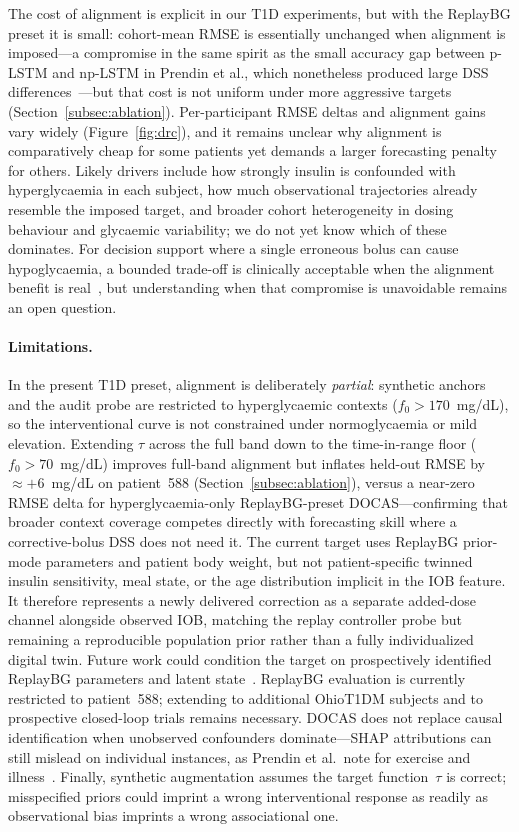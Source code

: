\documentclass[a4paper,fleqn]{cas-sc}
\begin{document}
The cost of alignment is explicit in our T1D experiments, but with the
ReplayBG preset it is small: cohort-mean RMSE is essentially unchanged when
alignment is imposed---a compromise in the same spirit as the small accuracy gap between
p-LSTM and np-LSTM in Prendin et al., which nonetheless produced large DSS
differences~\citep{prendin2023}---but that cost is not uniform under more
aggressive targets (Section~\ref{subsec:ablation}). Per-participant
RMSE deltas and alignment gains vary widely (Figure~\ref{fig:drc}), and it
remains unclear why alignment is comparatively cheap for some patients yet
demands a larger forecasting penalty for others. Likely drivers include how
strongly insulin is confounded with hyperglycaemia in each subject, how much
observational trajectories already resemble the imposed target, and broader
cohort heterogeneity in dosing behaviour and glycaemic variability; we do not yet
know which of these dominates. For decision support where a single erroneous
bolus can cause hypoglycaemia, a bounded trade-off is clinically acceptable when
the alignment benefit is real~\citep{battelino2019,nimri2020}, but understanding
when that compromise is unavoidable remains an open question.

\paragraph{Limitations.}
In the present T1D preset, alignment is deliberately \emph{partial}: synthetic
anchors and the audit probe are restricted to hyperglycaemic contexts
($f_0>170$~mg/dL), so the interventional curve is not constrained under
normoglycaemia or mild elevation. Extending $\tau$ across the full band down to
the time-in-range floor ($f_0>70$~mg/dL) improves full-band alignment but
inflates held-out RMSE by $\approx+6$~mg/dL on patient~588
(Section~\ref{subsec:ablation}), versus a near-zero RMSE delta for
hyperglycaemia-only ReplayBG-preset DOCAS---confirming that broader context
coverage competes
directly with forecasting skill where a corrective-bolus DSS does not need it.
The current target uses ReplayBG prior-mode parameters and
patient body weight, but not patient-specific twinned insulin sensitivity,
meal state, or the age distribution implicit in the IOB feature. It therefore
represents a newly delivered correction as a separate added-dose channel
alongside observed IOB, matching the replay controller probe but remaining a
reproducible
population prior rather than a fully individualized digital twin.
Future work could condition the target on prospectively identified ReplayBG
parameters and latent state~\citep{cappon2023,schiavon2018}. ReplayBG
evaluation is currently
restricted to patient~588; extending to additional OhioT1DM subjects and to
prospective closed-loop trials remains necessary. DOCAS does not replace causal
identification when unobserved confounders dominate---SHAP attributions can
still mislead on individual instances, as Prendin et al.\ note for exercise
and illness~\citep{prendin2023}. Finally, synthetic augmentation assumes the target function~$\tau$ is correct;
misspecified priors could imprint a wrong interventional response as readily as
observational bias imprints a wrong associational one.
\end{document}
